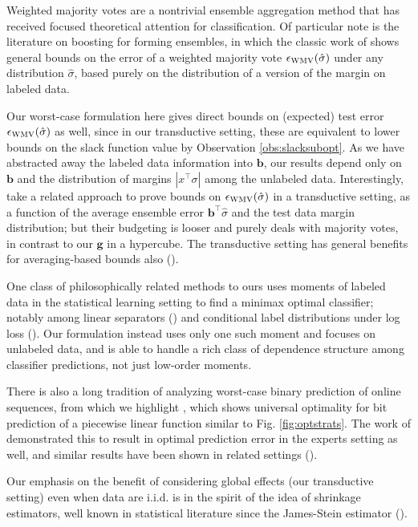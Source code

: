 \documentclass{colt2015} %
\newcommand{\vb}{\mathbf{b}}
\newcommand{\vg}{\mathbf{g}}
\newcommand{\vz}{\mathbf{z}}
\newcommand{\abs}[1]{\left| #1 \right|}
\newcommand{\wmv}{\textsc{WMV}}
\newcommand{\sighat}{\hat{\sigma}}
\newcommand{\lrp}[1]{\left(#1\right)}
\renewcommand{\comment}[3]{\marginpar{\textcolor{#2}{#1: #3}}}
\newcommand{\akshay}[1]{\comment{Akshay}{orange}{#1}}
\begin{document}

Weighted majority votes are a nontrivial ensemble aggregation method 
that has received focused theoretical attention for classification. 
Of particular note is the literature on boosting for forming ensembles, 
in which the classic work of \cite{SFBL98} shows general bounds 
on the error of a weighted majority vote $\epsilon_{\wmv} (\sighat)$ under any distribution $\sighat$,
based purely on the distribution of a version of the margin on labeled data. 

Our worst-case formulation here gives direct bounds on (expected) test error $\epsilon_{\wmv} (\sighat)$ as well, 
since in our transductive setting, these are equivalent to lower bounds on the slack function value by Observation \ref{obs:slacksubopt}. 
As we have abstracted away the labeled data information into $\vb$, our results depend only on $\vb$ and 
the distribution of margins $\abs{x^\top \sigma}$ among the unlabeled data. 
Interestingly, \cite{AUL09} take a related approach to prove bounds on $\epsilon_{\wmv} (\sighat)$  
in a transductive setting, as a function of the average ensemble error $\vb^\top \sighat$ and the test data margin distribution; 
but their budgeting is looser and purely deals with majority votes, 
in contrast to our $\vg$ in a hypercube. 
The transductive setting has general benefits for averaging-based bounds also (\cite{BL03}).

One class of philosophically related methods to ours uses moments of labeled data 
in the statistical learning setting to find a minimax optimal classifier; 
notably among linear separators (\cite{LGBJ01}) and conditional label distributions under log loss (\cite{LZ14}). 
Our formulation instead uses only one such moment and focuses on unlabeled data, and is able to handle 
a rich class of dependence structure among classifier predictions, not just low-order moments. 

There is also a long tradition of analyzing worst-case binary prediction of online sequences, 
from which we highlight \cite{FMG92}, 
which shows universal optimality for bit prediction of a piecewise linear function similar to Fig. \ref{fig:optstrats}. 
The work of \cite{CBFHHSW93} demonstrated this to result in optimal prediction error 
in the experts setting as well, and similar results have been shown in related settings (\cite{V90, AP13}). 

Our emphasis on the benefit of considering global effects (our transductive setting) even when data are i.i.d. 
is in the spirit of the idea of shrinkage estimators, well known in statistical literature since the James-Stein estimator (\cite{EM77}).
\fi


{}
\end{document}
